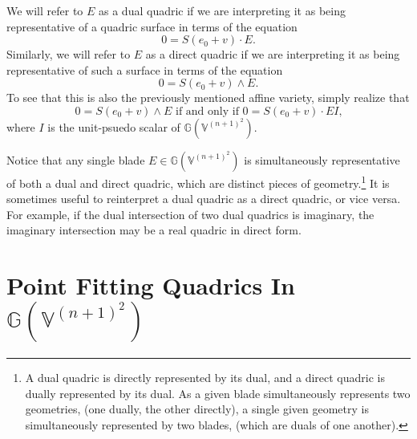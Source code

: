 \documentclass{birkjour}
\theoremstyle{definition}
\theoremstyle{remark}
\numberwithin{equation}{section}
\newcommand{\G}{\mathbb{G}}
\newcommand{\V}{\mathbb{V}}
\begin{document}
We will refer to $E$ as a dual quadric if we are interpreting it as being representative
of a quadric surface in terms of the equation
\begin{equation}\label{equ_dual_quadric}
0 = S(e_0+v)\cdot E.
\end{equation}
Similarly, we will refer to $E$ as a direct quadric if we are interpreting it as being
representative of such a surface in terms of the equation
\begin{equation}\label{equ_direct_quadric}
0 = S(e_0+v)\wedge E.
\end{equation}
To see that this is also the previously mentioned affine variety, simply realize that
\begin{equation}
\mbox{$0 = S(e_0+v)\wedge E$ if and only if $0 = S(e_0+v)\cdot EI$,}
\end{equation}
where $I$ is the unit-psuedo scalar of $\G(\V^{(n+1)^2})$.

Notice that any single blade $E\in\G(\V^{(n+1)^2})$ is
simultaneously representative of both a dual and direct quadric, which are distinct
pieces of geometry.\footnote{A dual quadric is directly represented by its dual, and
a direct quadric is dually represented by its dual.  As a given blade simultaneously
represents two geometries, (one dually, the other directly), a single given geometry is
simultaneously represented by two blades, (which are duals of one another).}
It is sometimes useful to reinterpret a dual quadric
as a direct quadric, or vice versa.  For example, if the dual intersection of
two dual quadrics is imaginary, the imaginary intersection may be a real quadric
in direct form.


\section{Point Fitting Quadrics In $\G(\V^{(n+1)^2})$}
\end{document}
